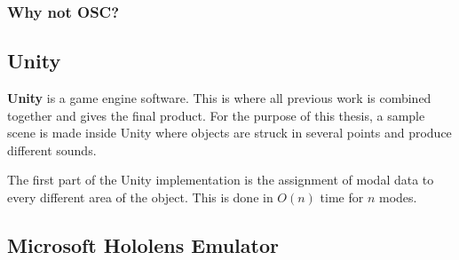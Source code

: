\subsubsection{Why not OSC?}

\subsection{Unity\textsuperscript{\textregistered}}
\textbf{Unity\textsuperscript{\textregistered}} is a game engine software. This is where all previous work is combined together and gives the final product. For the purpose of this thesis, a sample scene is made inside Unity\textsuperscript{\textregistered} where objects are struck in several points and produce different sounds. 

The first part of the Unity\textsuperscript{\textregistered} implementation is the assignment of modal data to every different area of the object. This is done in $O(n)$ time for $n$ modes. 


\subsection{Microsoft Hololens Emulator}

